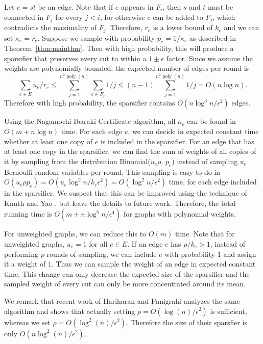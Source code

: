 \documentclass[11pt]{article}
\numberwithin{equation}{section}
\newcommand{\poly}{\operatorname{poly}}
\newcommand{\Theorem}[1]{Theorem~\ref{thm:#1}}
\begin{document}
Let $e=st$ be an edge.
Note that if $e$ appears in $F_i$, 
then $s$ and $t$ must be connected in $F_j$ for every $j<i$,
for otherwise $e$ can be added to $F_j$,
which contradicts the maximality of $F_j$.
Therefore, $r_e$ is a lower bound of $k_e$
and we can set $\kappa_e=r_e$.
Suppose we sample with probability $p_e=1/\kappa_e$ as described in \Theorem{mainthm}.
Then with high probability, this will produce a sparsifier that
preserves every cut to within a $1\pm \epsilon$ factor.
Since we assume the weights are polynomially bounded,
the expected number of edges per round is 
$$
    \sum_{e\in E}u_e/r_e
    \le \sum_{j=1}^{n^2 \poly(n)}\sum_{e\in F_j}1/j
    \le (n-1)\sum_{j=1}^{n^2 \poly(n)}1/j
    = O(n\log n).
$$
Therefore with high probability,
the sparsifier contains $O(n\log^3n/\epsilon^2)$ edges.

Using the Nagamochi-Ibaraki Certificate algorithm,
all $\kappa_e$ can be found in $O(m+n\log n)$ time.
For each edge $e$, we can decide in expected constant time 
whether at least one copy of $e$ is included in the sparsifier.
For an edge that has at least one copy in the sparsifier,
we can find the sum of weights of all copies of it 
by sampling from the distribution Binomial($u_e \rho$, $p_e$)
instead of sampling $u_e$ Bernoulli random variables per round.
This sampling is easy to do in
$O(u_e \rho p_e)=O(u_e\log^2 n/k_e\epsilon^2)=O(\log^2 n/\epsilon^2)$ time,
for each edge included in the sparsifier.
We suspect that this can be improved using the technique of Knuth and Yao
\cite{KnuthYao} \cite[Ch.~15]{Devroye},
but leave the details to future work.
Therefore, the total running time is $O(m+n\log^5n/\epsilon^4)$ for graphs with polynomial weights.

For unweighted  graphs, we can reduce this to $O(m)$ time.
Note that for unweighted graphs, $u_e=1$ for all $e\in E$.
If an edge $e$ has $\rho/k_e>1$,
instead of performing $\rho$ rounds of sampling,
we can include $e$ with probability $1$ and assign it a weight of $1$.
Thus we can sample the weight of an edge in expected constant time.
This change can only decrease the expected size of the sparsifier
and the sampled weight of every cut can only be more concentrated around its mean.

We remark that recent work of Hariharan and Panigrahi \cite{HP}
analyzes the same algorithm and shows that 
actually setting $\rho = O(\log(n)/\epsilon^2)$ is sufficient,
whereas we set $\rho = O(\log^2(n)/\epsilon^2)$.
Therefore the size of their sparsfier is only $O(n\log^2(n)/\epsilon^2)$.
\end{document}
